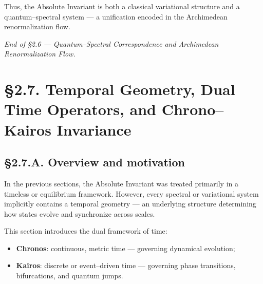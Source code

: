Thus, the Absolute Invariant is both a classical variational structure and a quantum–spectral system — a unification encoded in the Archimedean renormalization flow.

\begin{center}
\textit{End of §2.6 — Quantum–Spectral Correspondence and Archimedean Renormalization Flow.}
\end{center}


\section{§2.7. Temporal Geometry, Dual Time Operators, and Chrono–Kairos Invariance}
\label{sec:2.7-time}

\subsection*{§2.7.A. Overview and motivation}

In the previous sections, the Absolute Invariant was treated primarily in a timeless or equilibrium framework.  
However, every spectral or variational system implicitly contains a temporal geometry — an underlying structure determining how states evolve and synchronize across scales.

This section introduces the dual framework of time:
\begin{itemize}
\item \textbf{Chronos}: continuous, metric time — governing dynamical evolution;
\item \textbf{Kairos}: discrete or event–driven time — governing phase transitions, bifurcations, and quantum jumps.
\end{itemize}

